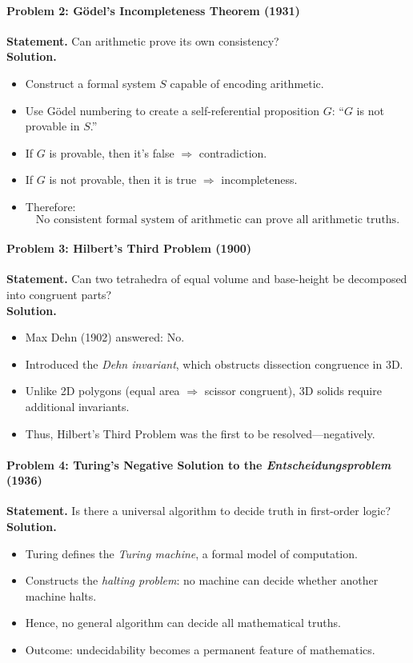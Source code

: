 \documentclass[9pt]{article}
\begin{document}
\paragraph{Problem 2: Gödel’s Incompleteness Theorem (1931)}
\textbf{Statement.} Can arithmetic prove its own consistency? \\
\textbf{Solution.}
\begin{itemize}
  \item Construct a formal system \( S \) capable of encoding arithmetic.
  \item Use Gödel numbering to create a self-referential proposition \( G \): ``\( G \) is not provable in \( S \).''
  \item If \( G \) is provable, then it’s false \( \Rightarrow \) contradiction.
  \item If \( G \) is not provable, then it is true \( \Rightarrow \) incompleteness.
  \item Therefore:
  \[
  \text{No consistent formal system of arithmetic can prove all arithmetic truths.}
  \]
\end{itemize}

\paragraph{Problem 3: Hilbert’s Third Problem (1900)}
\textbf{Statement.} Can two tetrahedra of equal volume and base-height be decomposed into congruent parts? \\
\textbf{Solution.}
\begin{itemize}
  \item Max Dehn (1902) answered: No.
  \item Introduced the \textit{Dehn invariant}, which obstructs dissection congruence in 3D.
  \item Unlike 2D polygons (equal area \( \Rightarrow \) scissor congruent), 3D solids require additional invariants.
  \item Thus, Hilbert’s Third Problem was the first to be resolved---negatively.
\end{itemize}

\paragraph{Problem 4: Turing’s Negative Solution to the \textit{Entscheidungsproblem} (1936)}
\textbf{Statement.} Is there a universal algorithm to decide truth in first-order logic? \\
\textbf{Solution.}
\begin{itemize}
  \item Turing defines the \textit{Turing machine}, a formal model of computation.
  \item Constructs the \textit{halting problem}: no machine can decide whether another machine halts.
  \item Hence, no general algorithm can decide all mathematical truths.
  \item Outcome: undecidability becomes a permanent feature of mathematics.
\end{itemize}
\end{document}

